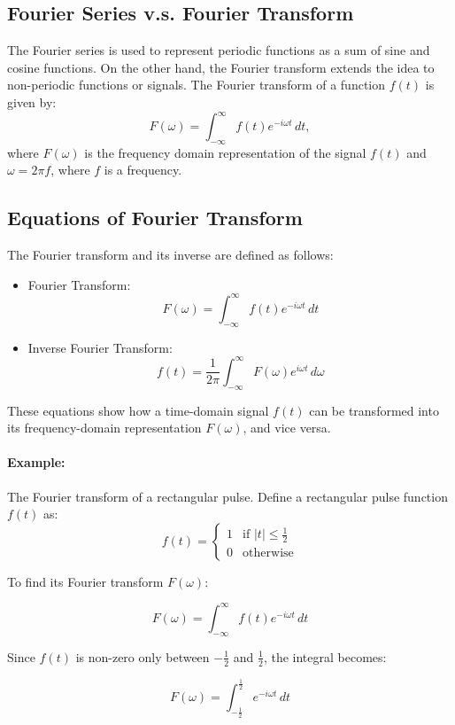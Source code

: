 \subsection{Fourier Series v.s. Fourier Transform}

The Fourier series is used to represent periodic functions as a sum of sine and cosine functions. On the other hand, the Fourier transform extends the idea to non-periodic functions or signals. The Fourier transform of a function \( f(t) \) is given by:
\[ F(\omega) = \int_{-\infty}^{\infty} f(t) e^{-i \omega t} \, dt, \]
where \( F(\omega) \) is the frequency domain representation of the signal \( f(t) \) and $\omega=2\pi f$, where $f$ is a frequency.

\subsection{Equations of Fourier Transform}
The Fourier transform and its inverse are defined as follows:
\begin{itemize}
	\item Fourier Transform:
	\[ F(\omega) = \int_{-\infty}^{\infty} f(t) e^{-i \omega t} \, dt \]
	\item Inverse Fourier Transform:
	\[ f(t) = \frac{1}{2\pi} \int_{-\infty}^{\infty} F(\omega) e^{i \omega t} \, d\omega \]
\end{itemize}
These equations show how a time-domain signal \( f(t) \) can be transformed into its frequency-domain representation \( F(\omega) \), and vice versa.

\paragraph{Example: }The Fourier transform of a rectangular pulse.
Define a rectangular pulse function \( f(t) \) as:
\[ f(t) = \begin{cases} 
1 & \text{if } |t| \leq \frac{1}{2} \\
0 & \text{otherwise} 
\end{cases} \]

To find its Fourier transform \( F(\omega) \):

\[ F(\omega) = \int_{-\infty}^{\infty} f(t) e^{-i \omega t} \, dt \]

Since \( f(t) \) is non-zero only between \( -\frac{1}{2} \) and \( \frac{1}{2} \), the integral becomes:

\[ F(\omega) = \int_{-\frac{1}{2}}^{\frac{1}{2}} e^{-i \omega t} \, dt \]

